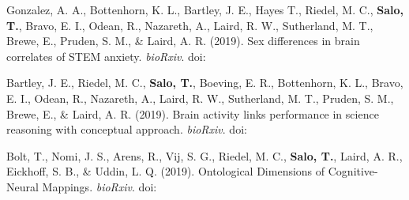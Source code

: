 \documentclass[10pt]{article}
\newcommand{\sectionstyle}{\LARGE \fontfamily{lmr}\selectfont}
\newcommand{\textlink}[3][blue]{\href{#2}{\color{#1}{#3}}}
\begin{document}
\bigskip

\begin{center}\sectionstyle{PREPRINTS}\end{center}

\begin{hangparas}{.25in}{1}

	Gonzalez, A. A., Bottenhorn, K. L., Bartley, J. E., Hayes T., Riedel, M. C.,
	\textbf{Salo, T.}, Bravo, E. I., Odean, R., Nazareth, A., Laird, R. W.,
	Sutherland, M. T., Brewe, E., Pruden, S. M., \& Laird, A. R. (2019).
	Sex differences in brain correlates of STEM anxiety. \emph{bioRxiv}.
	doi:\textlink{https://doi.org/10.1101/528075}{10.1101/528075}

	\bigskip

	Bartley, J. E., Riedel, M. C., \textbf{Salo, T.}, Boeving, E. R.,
	Bottenhorn, K. L., Bravo, E. I., Odean, R., Nazareth, A., Laird, R. W.,
	Sutherland, M. T., Pruden, S. M., Brewe, E., \& Laird, A. R. (2019).
	Brain activity links performance in science reasoning with conceptual
	approach. \emph{bioRxiv}.
	doi:\textlink{https://doi.org/10.1101/526574}{10.1101/526574}

	\bigskip

	Bolt, T., Nomi, J. S., Arens, R., Vij, S. G., Riedel, M. C.,
	\textbf{Salo, T.}, Laird, A. R., Eickhoff, S. B., \& Uddin, L. Q. (2019).
	Ontological Dimensions of Cognitive-Neural Mappings. \emph{bioRxiv}.
	doi:\textlink{https://doi.org/10.1101/524520}{10.1101/524520}

\end{hangparas}

\bigskip

\begin{center}\sectionstyle{PRESENTATIONS}\end{center}
\end{document}
